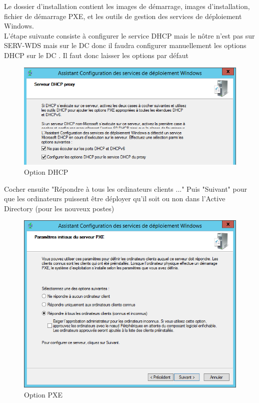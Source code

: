 \documentclass[11pt,a4paper,oneside]{article}
\begin{document}
Le dossier d’installation contient les images de démarrage, images d’installation, fichier de démarrage PXE, et les outils de gestion des services de déploiement Windows. \\

L'étape suivante consiste à configurer le service DHCP mais le nôtre n'est pas sur SERV-WDS mais sur le DC donc il faudra configurer manuellement les options DHCP sur le DC . Il faut donc laisser les options par défaut

\begin{figure}[hbtp]
\centering
\includegraphics[scale=0.8]{Pictures/Configuration/Conf5.png}
\caption{\label{etiquette} Option DHCP}
\end{figure}

\newpage


Cocher ensuite "Répondre à tous les ordinateurs clients ..." Puis "Suivant" pour que les ordinateurs puissent être déployer qu'il soit ou non dans l'Active Directory (pour les nouveux postes)

\begin{figure}[hbtp]
\centering
\includegraphics[scale=0.7]{Pictures/Configuration/Conf6.png}
\caption{\label{etiquette} Option PXE}
\end{figure}
\end{document}
